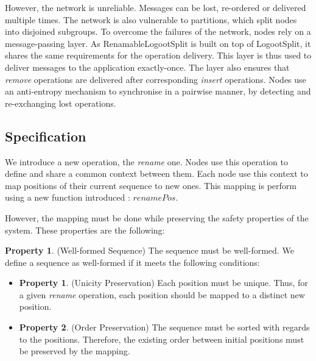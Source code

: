 \documentclass{article}
\theoremstyle{definition}
\newtheorem{property}{Property}
\newtheorem{subproperty}{Property}[property]
\begin{document}
However, the network is unreliable.
Messages can be lost, re-ordered or delivered multiple times.
The network is also vulnerable to partitions, which split nodes into disjoined subgroups.
To overcome the failures of the network, nodes rely on a message-passing layer.
As RenamableLogootSplit is built on top of LogootSplit, it shares the same requirements for the operation delivery.
This layer is thus used to deliver messages to the application exactly-once.
The layer also ensures that \emph{remove} operations are delivered after corresponding \emph{insert} operations.
Nodes use an anti-entropy mechanism to synchronise in a pairwise manner, by detecting and re-exchanging lost operations.

\subsection{Specification}

We introduce a new operation, the \emph{rename} one.
Nodes use this operation to define and share a common context between them.
Each node use this context to map positions of their current sequence to new ones.
This mapping is perform using a new function introduced : $renamePos$.

However, the mapping must be done while preserving the safety properties of the system.
These properties are the following:

\begin{property}(Well-formed Sequence)
    The sequence must be well-formed.
    We define a sequence as well-formed if it meets the following conditions:
    \begin{itemize}[noitemsep]
        \item[~]
        \begin{subproperty}(Unicity Preservation)
            Each position must be unique.
            Thus, for a given \emph{rename} operation, each position should be mapped to a distinct new position.
        \end{subproperty}
        \item[~]
        \begin{subproperty}(Order Preservation)
            The sequence must be sorted with regards to the positions.
            Therefore, the existing order between initial positions must be preserved by the mapping.
        \end{subproperty}
    \end{itemize}
\end{property}
\end{document}
